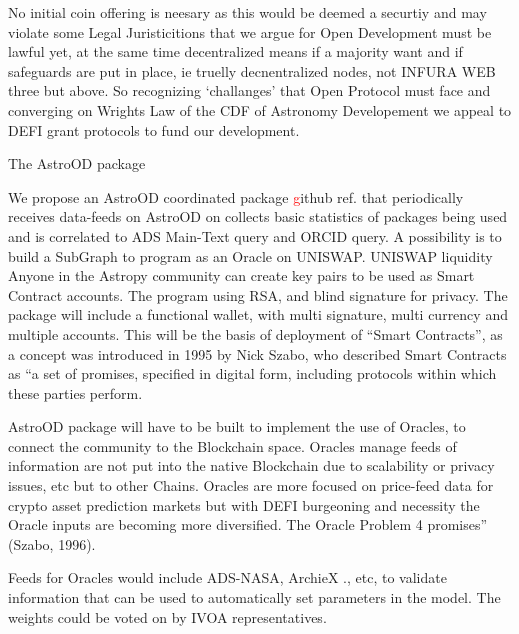 \documentclass[final,5p,times,twocolumn,authoryear]{elsarticle}
\begin{document}
No initial coin offering is neesary as this would be deemed a securtiy and may violate some Legal Juristicitions that we argue for Open Development must be lawful yet, at the same time decentralized means if a majority want and if safeguards are put in place, ie truelly decnentralized nodes, not INFURA WEB three but above. So recognizing `challanges' that Open Protocol must face and converging on Wrights Law of the CDF of Astronomy Developement we appeal to DEFI grant protocols to fund our development. 


The AstroOD package 

We propose an AstroOD coordinated package \textcolor{red} github ref. that periodically receives data-feeds on AstroOD on collects basic statistics of packages being used and is correlated to ADS Main-Text query and ORCID query. A possibility is to build a SubGraph to program as an Oracle on UNISWAP. UNISWAP liquidity    Anyone in the Astropy community can create key pairs to be used as Smart Contract accounts. The program using RSA, and blind signature for privacy. The package will include a functional wallet, with multi signature, multi currency and multiple accounts. This will be the basis of deployment of “Smart Contracts”, as a concept was introduced in 1995 by Nick Szabo, who described Smart Contracts as “a set of promises,
specified in digital form, including protocols within which these parties perform.

AstroOD package will have to be built to implement the use of Oracles, to connect the community to the Blockchain space. Oracles manage feeds of information are not put into the native Blockchain due to scalability or privacy issues, etc but to other Chains.  Oracles are more focused on price-feed data for crypto asset prediction markets but with DEFI burgeoning and necessity the Oracle inputs are becoming more diversified.  The Oracle Problem 4 promises” (Szabo, 1996). 

Feeds for Oracles would include ADS-NASA, ArchieX ., etc,  to validate information that can be used to automatically set parameters in the model. The weights could be voted on by IVOA representatives.
\end{document}
